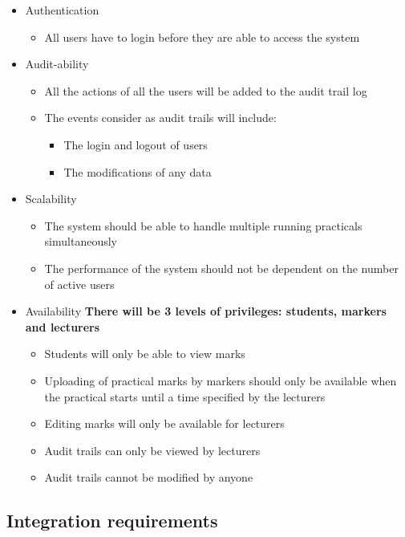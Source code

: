 \documentclass[12pt]{article}
\begin{document}
			\vspace{0.2in}
			\begin{itemize}
					\item Authentication
						\begin{itemize}
							\item All users have to login before they are able to access the system
						\end{itemize}
					\item Audit-ability
						\begin{itemize}
							\item All the actions of all the users will be added to the audit trail log
							\item The events consider as audit trails will include:
							\begin{itemize}
								\item The login and logout of users
								\item The modifications of any data
							\end{itemize}
						\end{itemize}
					\item Scalability
						\begin{itemize}
							\item The system should be able to handle multiple running practicals simultaneously
							\item The performance of the system should not be dependent on the number of active users
						\end{itemize}
					\item Availability
						\textbf{There will be 3 levels of privileges: students, markers and lecturers}
						\begin{itemize}
							\item Students will only be able to view marks
							\item Uploading of practical marks by markers should only be available when the practical starts until a time specified by the lecturers
							\item Editing marks will only be available for lecturers
							\item Audit trails can only be viewed by lecturers
							\item Audit trails cannot be modified by anyone
						\end{itemize}
				\end{itemize}
			
		
		\subsection{Integration requirements}
		
\end{document}
